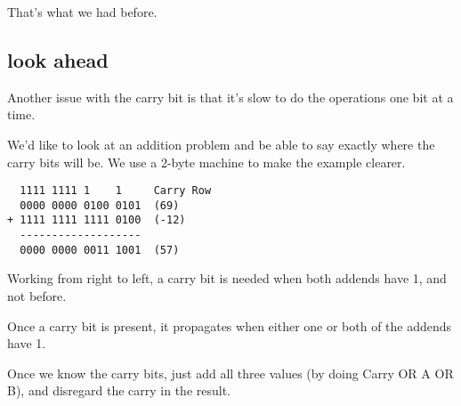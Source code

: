 \documentclass[11pt, oneside]{article}
\begin{document}
That's what we had before.

\subsection*{look ahead}

Another issue with the carry bit is that it's slow to do the operations one bit at a time.

We'd like to look at an addition problem and be able to say exactly where the carry bits will be.  We use a 2-byte machine to make the example clearer.

\begin{verbatim}
  1111 1111 1    1     Carry Row
  0000 0000 0100 0101  (69)
+ 1111 1111 1111 0100  (-12)
  -------------------
  0000 0000 0011 1001  (57)
\end{verbatim}


Working from right to left, a carry bit is needed when
both addends have 1, and not before.

Once a carry bit is present, it propagates when either one or both of the addends have 1.

Once we know the carry bits, just add all three values (by doing Carry OR A OR B), and disregard the carry in the result.
\end{document}
